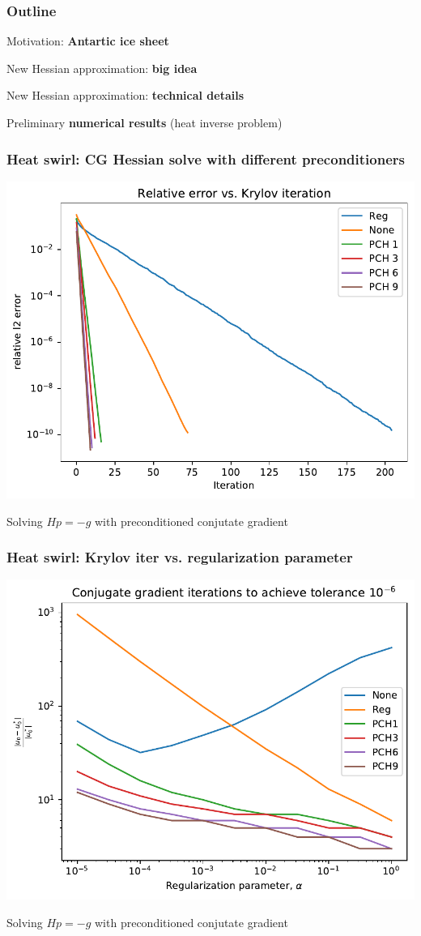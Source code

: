 \documentclass[10pt,final,xcolor=dvipsnames]{beamer}
\begin{document}
\begin{frame}
	\frametitle{Outline}
	{\Large
		\begin{itemize}
			\setlength\itemsep{2em}
			{\color{lightgray}\item Motivation: \textbf{Antartic ice sheet}}
			{\color{lightgray}\item New Hessian approximation: \textbf{big idea}}
			{\color{lightgray}\item New Hessian approximation: \textbf{technical details}}
			\item Preliminary \textbf{numerical results} (heat inverse problem)
		\end{itemize}
	}
\end{frame}
\begin{frame}
	\frametitle{Heat swirl: CG Hessian solve with different preconditioners}
	\begin{center}
		\includegraphics[width=0.75\columnwidth]{error_vs_krylov_iter.pdf}
	\end{center}
Solving $Hp=-g$ with preconditioned conjutate gradient
\end{frame}
\begin{frame}
	\frametitle{Heat swirl: Krylov iter vs. regularization parameter}
	\begin{center}
		\includegraphics[width=0.75\columnwidth]{krylov_iter_vs_regularization_parameter.pdf}
	\end{center}
Solving $Hp=-g$ with preconditioned conjutate gradient
\end{frame}
\end{document}

